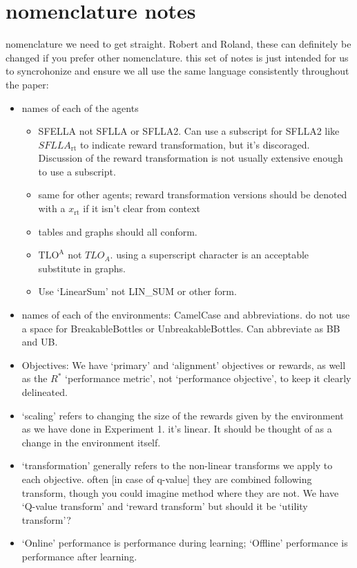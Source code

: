 \section*{nomenclature notes}
nomenclature we need to get straight. Robert and Roland, these can definitely be changed if you prefer other nomenclature. this set of notes is just intended for us to syncrohonize and ensure we all use the same language consistently throughout the paper:

\begin{itemize}
    \item names of each of the agents
        \begin{itemize}
            \item SFELLA not SFLLA or SFLLA2. Can use a subscript for SFLLA2 like $SFLLA_{\text{rt}}$ to indicate reward transformation, but it's discoraged. Discussion of the reward transformation is not usually extensive enough to use a subscript. 
            \item same for other agents; reward transformation versions should be denoted with a $x_{\text{rt}}$ if it isn't clear from context
            \item tables and graphs should all conform.
            \item $\text{TLO}^\text{A}$ not $TLO_A$. using a superscript character is an acceptable substitute in graphs.
            \item Use `LinearSum' not LIN\_SUM or other form.
        \end{itemize}
    \item names of each of the environments: CamelCase and abbreviations. do not use a space for BreakableBottles or UnbreakableBottles. Can abbreviate as BB and UB. 
    \item Objectives: We have `primary' and `alignment' objectives or rewards, as well as the $R^*$ `performance metric', not `performance objective', to keep it clearly delineated.
    \item `scaling' refers to changing the size of the rewards given by the environment as we have done in Experiment 1. it's linear. It should be thought of as a change in the environment itself.
    \item `transformation' generally refers to the non-linear transforms we apply to each objective. often [in case of q-value] they are combined following transform, though you could imagine method where they are not. We have `Q-value transform' and `reward transform' but should it be `utility transform'?
    \item `Online' performance is performance during learning; `Offline' performance is performance after learning.
\end{itemize}

